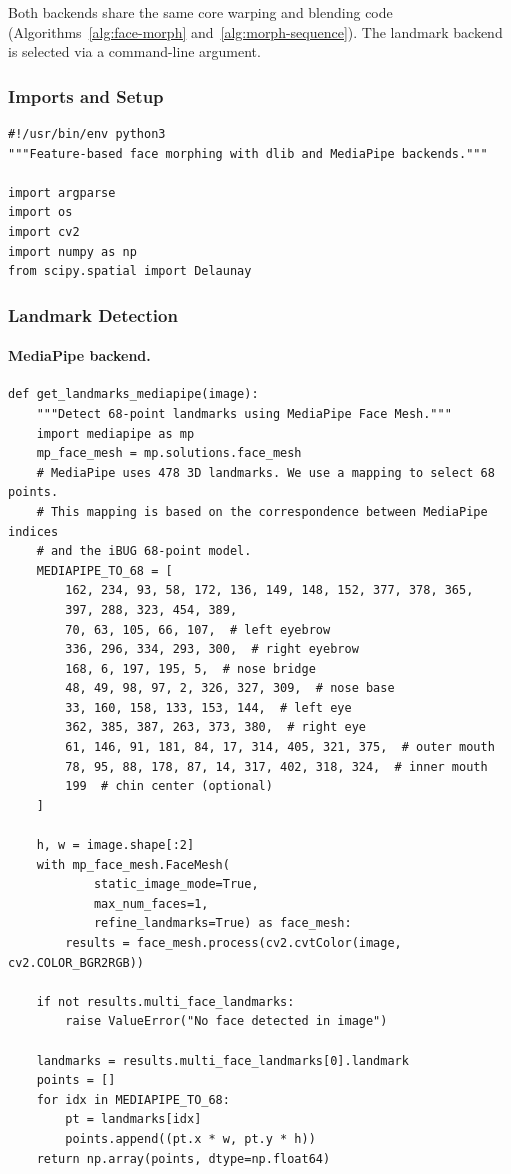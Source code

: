 Both backends share the same core warping and blending code (Algorithms~\ref{alg:face-morph} and~\ref{alg:morph-sequence}). The landmark backend is selected via a command-line argument.

\subsubsection*{Imports and Setup}

\begin{verbatim}
#!/usr/bin/env python3
"""Feature-based face morphing with dlib and MediaPipe backends."""

import argparse
import os
import cv2
import numpy as np
from scipy.spatial import Delaunay
\end{verbatim}

\subsubsection*{Landmark Detection}

\paragraph{MediaPipe backend.}

\begin{verbatim}
def get_landmarks_mediapipe(image):
    """Detect 68-point landmarks using MediaPipe Face Mesh."""
    import mediapipe as mp
    mp_face_mesh = mp.solutions.face_mesh
    # MediaPipe uses 478 3D landmarks. We use a mapping to select 68 points.
    # This mapping is based on the correspondence between MediaPipe indices
    # and the iBUG 68-point model.
    MEDIAPIPE_TO_68 = [
        162, 234, 93, 58, 172, 136, 149, 148, 152, 377, 378, 365,
        397, 288, 323, 454, 389,
        70, 63, 105, 66, 107,  # left eyebrow
        336, 296, 334, 293, 300,  # right eyebrow
        168, 6, 197, 195, 5,  # nose bridge
        48, 49, 98, 97, 2, 326, 327, 309,  # nose base
        33, 160, 158, 133, 153, 144,  # left eye
        362, 385, 387, 263, 373, 380,  # right eye
        61, 146, 91, 181, 84, 17, 314, 405, 321, 375,  # outer mouth
        78, 95, 88, 178, 87, 14, 317, 402, 318, 324,  # inner mouth
        199  # chin center (optional)
    ]

    h, w = image.shape[:2]
    with mp_face_mesh.FaceMesh(
            static_image_mode=True,
            max_num_faces=1,
            refine_landmarks=True) as face_mesh:
        results = face_mesh.process(cv2.cvtColor(image, cv2.COLOR_BGR2RGB))

    if not results.multi_face_landmarks:
        raise ValueError("No face detected in image")

    landmarks = results.multi_face_landmarks[0].landmark
    points = []
    for idx in MEDIAPIPE_TO_68:
        pt = landmarks[idx]
        points.append((pt.x * w, pt.y * h))
    return np.array(points, dtype=np.float64)
\end{verbatim}

